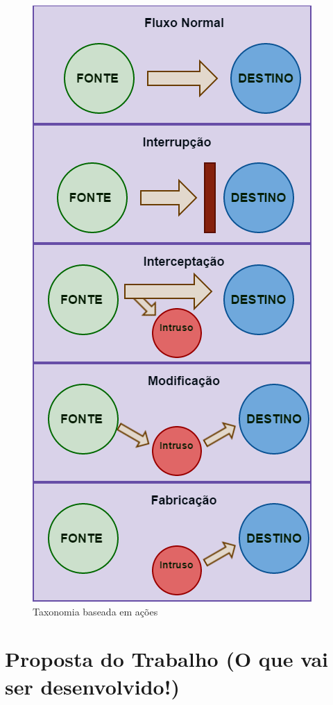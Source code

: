 \documentclass[
	12pt,				%
	openright,			%
	oneside,
	a4paper,			%
	english,			%
	french,				%
	spanish,			%
	brazil				%
	]{abntex2}
\begin{document}
\begin{figure}[!htb]
     \centering
     \includegraphics[scale=0.8]{Imagens/Classificacoes.png}
     \caption{Taxonomia baseada em ações}
\end{figure}


\chapter[Proposta do Trabalho]{Proposta do Trabalho (O que vai ser desenvolvido!)}
\end{document}
